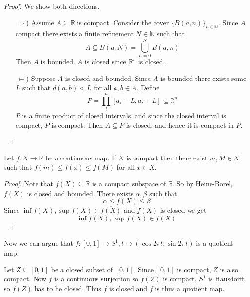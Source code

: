 \begin{proof}
  We show both directions.
  \begin{enumerate}
    \item[\( \Rightarrow \))]
      Assume \( A \subseteq \mathbb{R} \) is compact.
      Consider the cover \( \{ B(a, n) \}_{n \in \mathbb{N}}  \).
      Since \( A \) compact there exists a finite refinement
    \( N \in \mathbb{N} \) such that
    \[
      A \subseteq B(a, N) = \bigcup_{n = 0}^N B(a, n)
    \]
    Then \( A \) is bounded. \( A \) is closed since \( \mathbb{R}^n \)
    is closed.
    \item[\( \Leftarrow \))]
      Suppose \( A \) is closed and bounded.
      Since \( A \) is bounded there exists
      some \( L \) such that \( d(a, b) < L \)
      for all \( a, b \in A \).
      Define
      \begin{equation}
        P = \prod_{i}^n \left[a_i - L, a_i + L\right] \subseteq \mathbb{R}^n
      \end{equation}
      \( P  \) is a finite product of closed intervals,
      and since the closed interval is compact, \( P \) 
      is compact. Then \( A \subseteq P \) is closed,
      and hence it is compact in \( P \).
  \end{enumerate}
\end{proof}

\begin{theorem}
    Let \( f: X \to \mathbb{R} \) be a continuous map.
    If \( X \) is compact then there exist \( m, M \in X \)
    such that \( f(m) \le f(x) \le f(M) \) for all \( x \in X \).
\end{theorem}

\begin{proof}
   Note that \( f(X) \subseteq \mathbb{R} \) is
   a compact subspace of \( \mathbb{R} \).
   So by Heine-Borel, \( f(X) \) is closed and bounded.
   There exists \( \alpha, \beta \) such that
   \[
    \alpha \le f(X) \le \beta
   \]
   Since \( \inf f(X), \sup f(X) \in \overline{f(X)} \)
   and \( f(X) \) is closed we get
   \[
    \inf f(X), \sup f(X) \in f(X)
   \]
\end{proof}

Now we can argue that \( f: [0, 1] \to S^1, t \mapsto (\cos 2\pi t, \sin 2\pi t) \) is a quotient map:

\begin{example}
  Let \( Z \subseteq [0, 1]  \) be a closed subset of \( [0, 1] \).
  Since \( [0, 1] \) is compact, \( Z \) is also compact.
  Now \( f \) is a continuous surjection so \( f(Z) \) is compact.
  \( S^1 \) is Hausdorff, so \( f(Z) \) has to be closed.
  Thus \( f \) is closed and \( f \) is thus a quotient map.
\end{example}

